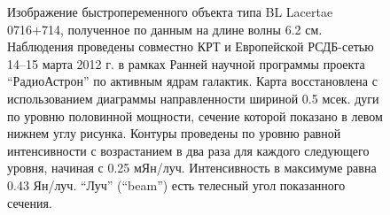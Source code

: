 \begin{figure}[]
 \caption{Изображение быстропеременного объекта типа BL Lacertae 0716+714, полученное
по данным на длине волны 6.2 см. Наблюдения проведены совместно КРТ и Европейской
РСДБ-сетью 14--15 марта 2012 г. в рамках Ранней научной программы проекта
``РадиоАстрон'' по активным ядрам галактик. Карта восстановлена
с использованием диаграммы направленности шириной 0.5 мсек. дуги
по уровню половинной мощности, сечение которой показано в левом нижнем углу
рисунка.  Контуры проведены по уровню равной интенсивности с
возрастанием в два раза для каждого следующего уровня, начиная с 0.25 мЯн/луч.
Интенсивность в максимуме равна 0.43 Ян/луч. ``Луч'' (``beam'') есть телесный
угол показанного сечения.}
 \label{fig:map_0716}
\end{figure}



